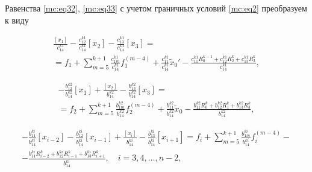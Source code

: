 Равенства \eqref{mc:eq32}, \eqref{mc:eq33} с учетом граничных условий \eqref{mc:eq2} преобразуем к виду

\begin{multline}

\label{mc:eq34}  

\frac{[x_1]}{c_{14}^{k1}}-\frac{c_{12}^{k1}}{c_{14}^{k1}} [x_{2}]-\frac{c_{13}^{k1}}{c_{14}^{k1}} [x_{3}]

=\\

=f_{1}+\sum_{m=5}^{k+1}\frac{c_{1m}^{k1}}{c_{14}^{k1}} f_1^{(m-4)}+\frac{c_{11}^{k1}}{c_{14}^{k1}} \widetilde{x}_0'


-\frac{c_{11}^{k1} R_{0}^{k-1}+c_{12}^{k1} R_{2}^k+c_{13}^{k1} R_{3}^k}{c_{14}^{k1}},

\end{multline}

\begin{multline}

\label{mc:eq37}  

-\frac{b_{12}^{k2}}{b_{14}^{k2}} [x_{1}]+\frac{[x_2]}{b_{14}^{k2}}-\frac{b_{13}^{k2}}{b_{14}^{k2}} [x_{3}]

=

\\

=f_{2}+\sum_{m=5}^{k+1}\frac{b_{1m}^{k2}}{b_{14}^{k2}} f_2^{(m-4)}+\frac{b_{11}^{k2}}{b_{14}^{k2}} \widetilde{x}_0



-\frac{b_{11}^{k2} R_{0}^k+b_{12}^{k2} R_{1}^k+b_{13}^{k2} R_{3}^k}{b_{14}^{k2}},

\end{multline}

\begin{multline}

\label{mc:eq37}  

-\frac{b_{11}^{ki}}{b_{14}^{ki}} [x_{i-2}]-\frac{b_{12}^{ki}}{b_{14}^{ki}} [x_{i-1}]+\frac{[x_i]}{b_{14}^{ki}}-\frac{b_{13}^{ki}}{b_{14}^{ki}} [x_{i+1}]


=f_{i}+\sum_{m=5}^{k+1}\frac{b_{1m}^{ki}}{b_{14}^{ki}} f_i^{(m-4)}-

\\

-\frac{b_{11}^{ki} R_{i-2}^k+b_{12}^{ki} R_{i-1}^k+b_{13}^{ki} R_{i+1}^k}{b_{14}^{ki}}

,\quad    i=3,  4,  \dots,  n-2,

\end{multline}

